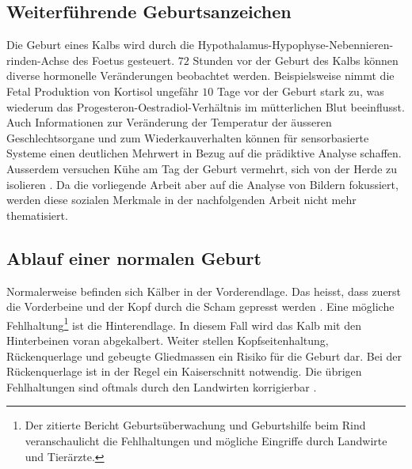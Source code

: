 \subsection{Weiterführende Geburtsanzeichen}
Die Geburt eines Kalbs wird durch die \gls{Hypothalamus}-\gls{Hypophyse}-Nebennieren-rinden-Achse des \gls{Foetus} gesteuert. $72$ Stunden vor der Geburt des Kalbs können diverse hormonelle Veränderungen beobachtet werden. Beispielsweise nimmt die \gls{Fetal} Produktion von \gls{Kortisol} ungefähr $10$ Tage vor der Geburt stark zu, was wiederum das \gls{Progesteron}-\gls{Oestradiol}-Verhältnis im mütterlichen Blut beeinflusst. Auch Informationen zur Veränderung der Temperatur der äusseren Geschlechtsorgane und zum Wiederkauverhalten können für sensorbasierte Systeme einen deutlichen Mehrwert in Bezug auf die prädiktive Analyse schaffen. Ausserdem versuchen Kühe am Tag der Geburt vermehrt, sich von der Herde zu isolieren \citep[S.1-4]{Saint-Dizier2015}. 
Da die vorliegende Arbeit aber auf die Analyse von Bildern fokussiert, werden diese sozialen Merkmale in der nachfolgenden Arbeit nicht mehr thematisiert. 
\subsection{Ablauf einer normalen Geburt}
Normalerweise befinden sich Kälber in der Vorderendlage. Das heisst, dass zuerst die Vorderbeine und der Kopf durch die Scham gepresst werden \citep{Muller2020}. Eine mögliche Fehlhaltung\footnote{Der zitierte Bericht \glqq Geburtsüberwachung und Geburtshilfe beim Rind\grqq{} veranschaulicht die Fehlhaltungen und mögliche Eingriffe durch Landwirte und Tierärzte.} ist die Hinterendlage. In diesem Fall wird das Kalb mit den Hinterbeinen voran abgekalbert. Weiter stellen Kopfseitenhaltung, Rückenquerlage und gebeugte Gliedmassen ein Risiko für die Geburt dar. Bei der Rückenquerlage ist in der Regel ein Kaiserschnitt notwendig. Die übrigen Fehlhaltungen sind oftmals durch den Landwirten korrigierbar \citep[S. 17, 24-26]{Traulsen2013}.

